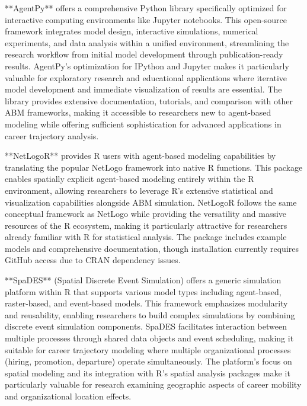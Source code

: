 \documentclass[main.tex]{subfiles}
\begin{document}
**AgentPy** offers a comprehensive Python library specifically optimized for interactive computing environments like Jupyter notebooks\parencite{agentpy}. This open-source framework integrates model design, interactive simulations, numerical experiments, and data analysis within a unified environment, streamlining the research workflow from initial model development through publication-ready results. AgentPy's optimization for IPython and Jupyter makes it particularly valuable for exploratory research and educational applications where iterative model development and immediate visualization of results are essential. The library provides extensive documentation, tutorials, and comparison with other ABM frameworks, making it accessible to researchers new to agent-based modeling while offering sufficient sophistication for advanced applications in career trajectory analysis.

**NetLogoR** provides R users with agent-based modeling capabilities by translating the popular NetLogo framework into native R functions\parencite{netlogor}. This package enables spatially explicit agent-based modeling entirely within the R environment, allowing researchers to leverage R's extensive statistical and visualization capabilities alongside ABM simulation. NetLogoR follows the same conceptual framework as NetLogo while providing the versatility and massive resources of the R ecosystem, making it particularly attractive for researchers already familiar with R for statistical analysis. The package includes example models and comprehensive documentation, though installation currently requires GitHub access due to CRAN dependency issues.

**SpaDES** (Spatial Discrete Event Simulation) offers a generic simulation platform within R that supports various model types including agent-based, raster-based, and event-based models\parencite{spades}. This framework emphasizes modularity and reusability, enabling researchers to build complex simulations by combining discrete event simulation components. SpaDES facilitates interaction between multiple processes through shared data objects and event scheduling, making it suitable for career trajectory modeling where multiple organizational processes (hiring, promotion, departure) operate simultaneously. The platform's focus on spatial modeling and its integration with R's spatial analysis packages make it particularly valuable for research examining geographic aspects of career mobility and organizational location effects.
\end{document}
